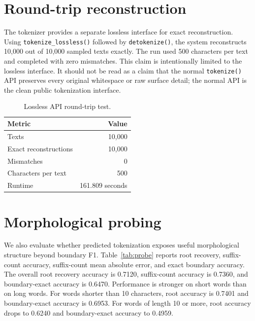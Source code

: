 \documentclass[11pt]{article}
\begin{document}
\section{Round-trip reconstruction}
The tokenizer provides a separate lossless interface for exact reconstruction. Using \texttt{tokenize\_lossless()} followed by \texttt{detokenize()}, the system reconstructs 10,000 out of 10,000 sampled texts exactly. The run used 500 characters per text and completed with zero mismatches. This claim is intentionally limited to the lossless interface. It should not be read as a claim that the normal \texttt{tokenize()} API preserves every original whitespace or raw surface detail; the normal API is the clean public tokenization interface.

\begin{table}[h]
\centering
\caption{Lossless API round-trip test.}
\label{tab:roundtrip}
\begin{tabular}{lr}
\toprule
Metric & Value \\
\midrule
Texts & 10,000 \\
Exact reconstructions & 10,000 \\
Mismatches & 0 \\
Characters per text & 500 \\
Runtime & 161.809 seconds \\
\bottomrule
\end{tabular}
\end{table}

\section{Morphological probing}
We also evaluate whether predicted tokenization exposes useful morphological structure beyond boundary F1. Table~\ref{tab:probe} reports root recovery, suffix-count accuracy, suffix-count mean absolute error, and exact boundary accuracy. The overall root recovery accuracy is 0.7120, suffix-count accuracy is 0.7360, and boundary-exact accuracy is 0.6470. Performance is stronger on short words than on long words. For words shorter than 10 characters, root accuracy is 0.7401 and boundary-exact accuracy is 0.6953. For words of length 10 or more, root accuracy drops to 0.6240 and boundary-exact accuracy to 0.4959.
\end{document}
